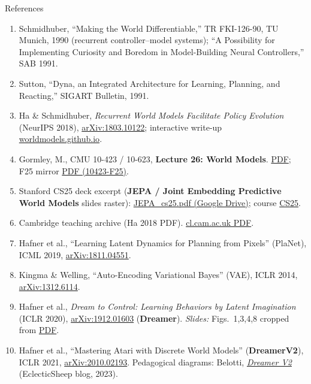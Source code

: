 \begin{frame}[allowframebreaks]{References}
  \footnotesize
  \begin{enumerate}\itemsep0.06em
    \item Schmidhuber, ``Making the World Differentiable,'' TR FKI-126-90, TU Munich, 1990 (recurrent controller--model systems); ``A Possibility for Implementing Curiosity and Boredom in Model-Building Neural Controllers,'' SAB 1991.
    \item Sutton, ``Dyna, an Integrated Architecture for Learning, Planning, and Reacting,'' SIGART Bulletin, 1991.
    \item Ha \& Schmidhuber, \textit{Recurrent World Models Facilitate Policy Evolution} (NeurIPS 2018), \href{https://arxiv.org/abs/1803.10122}{arXiv:1803.10122}; interactive write-up \href{https://worldmodels.github.io/}{worldmodels.github.io}.
    \item Gormley, M., CMU 10-423 / 10-623, \textbf{Lecture 26: World Models}. \href{https://www.cs.cmu.edu/~mgormley/courses/10423/slides/lecture26-world-models.pdf}{PDF}; F25 mirror \href{https://www.cs.cmu.edu/~mgormley/courses/10423-f25/slides/lecture26-world-models.pdf}{PDF (10423-F25)}.
    \item Stanford CS25 deck excerpt (\textbf{JEPA / Joint Embedding Predictive World Models} slides raster): \href{https://drive.google.com/file/d/1bF5Yfzf-FG5iNIAgsXn2DwVD3l3ymvZW/view}{JEPA\_cs25.pdf (Google Drive)}; course \href{https://web.stanford.edu/class/cs25/}{CS25}.
    \item Cambridge teaching archive (Ha 2018 PDF). \href{https://www.cl.cam.ac.uk/~ey204/teaching/ACS/R244_2022_2023/papers/ha_arXiv_2018.pdf}{cl.cam.ac.uk PDF}.
    \item Hafner et al., ``Learning Latent Dynamics for Planning from Pixels'' (PlaNet), ICML 2019, \href{https://arxiv.org/abs/1811.04551}{arXiv:1811.04551}.
    \item Kingma \& Welling, ``Auto-Encoding Variational Bayes'' (VAE), ICLR 2014, \href{https://arxiv.org/abs/1312.6114}{arXiv:1312.6114}.
    \item Hafner et al., \textit{Dream to Control: Learning Behaviors by Latent Imagination} (ICLR 2020), \href{https://arxiv.org/abs/1912.01603}{arXiv:1912.01603} (\textbf{Dreamer}). \textit{Slides:} Figs.~1,3,4,8 cropped from \href{https://arxiv.org/pdf/1912.01603.pdf}{PDF}.
    \item Hafner et al., ``Mastering Atari with Discrete World Models'' (\textbf{DreamerV2}), ICLR 2021, \href{https://arxiv.org/abs/2010.02193}{arXiv:2010.02193}. Pedagogical diagrams: Belotti, \href{https://eclecticsheep.ai/2023/07/06/dreamer_v2.html}{\textit{Dreamer V2}} (EclecticSheep blog, 2023).

\end{enumerate}
\end{frame}
